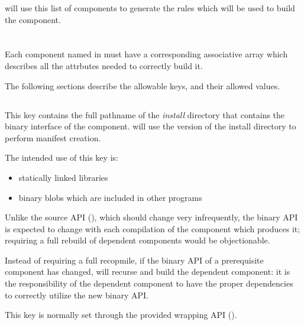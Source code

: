 \lmsbw will use this list of components to generate the rules which
will be used to build the component.

\section{}

Each component named in \lmsbwcomponents must have a corresponding
associative array which describes all the attrbutes needed to
correctly build it.

The following sections describe the allowable keys, and their allowed
values.

\subsection{}\label{lmsbwcomponent:binary-api}

This key contains the full pathname of the \emph{install} directory
that contains the binary interface of the component.  \lmsbw will use
the \destdir version of the install directory to perform \mtree
manifest creation.

The intended use of this key is:

\begin{itemize}
\item statically linked libraries
\item binary blobs which are included in other programs
\end{itemize}

Unlike the source API (), which should
change very infrequently, the binary API is expected to change with
each compilation of the component which produces it; requiring a full
rebuild of dependent components would be objectionable.

Instead of requiring a full recopmile, if the binary API of a
prerequisite component has changed, \lmsbw will recurse and build the
dependent component: it is the responsibility of the dependent
component to have the proper dependencies to correctly utilize the new
binary API.

This key is normally set through the provided wrapping API
().

\subsection{}

